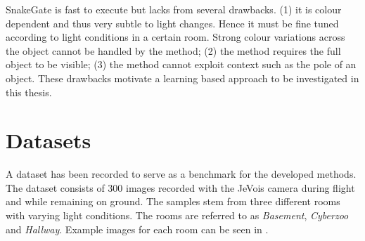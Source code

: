 SnakeGate is fast to execute but lacks from several drawbacks. (1) it is colour dependent and thus very subtle to light changes. Hence it must be fine tuned according to light conditions in a certain room. Strong colour variations across the object cannot be handled by the method; (2) the method requires the full object to be visible; (3) the method cannot exploit context  such as the pole of an object. These drawbacks motivate a learning based approach to be investigated in this thesis.


\section{Datasets}
\label{sec:datasets}
A dataset has been recorded to serve as a benchmark for the developed methods. The dataset consists of 300 images recorded with the JeVois camera during flight and while remaining on ground. The samples stem from three different rooms with varying light conditions. The rooms are referred to as \textit{Basement}, \textit{Cyberzoo} and \textit{Hallway}. Example images for each room can be seen in .
